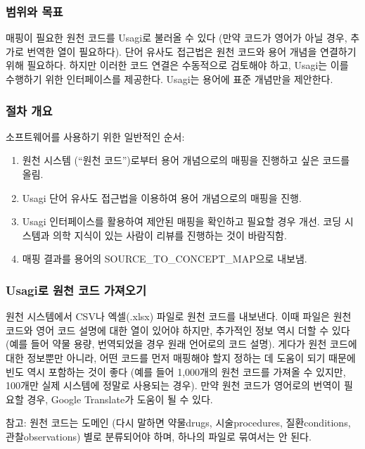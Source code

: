 \documentclass[10.5pt]{book}
\providecommand{\tightlist}{%
  \setlength{\itemsep}{0pt}\setlength{\parskip}{0pt}}
\theoremstyle{definition}
\theoremstyle{definition}
\theoremstyle{definition}
\theoremstyle{remark}
\begin{document}
\subsubsection*{범위와 목표}\label{--2}

매핑이 필요한 원천 코드를 Usagi로 불러올 수 있다 (만약 코드가 영어가
아닐 경우, 추가로 번역한 열이 필요하다). 단어 유사도 접근법은 원천
코드와 용어 개념을 연결하기 위해 필요하다. 하지만 이러한 코드 연결은
수동적으로 검토해야 하고, Usagi는 이를 수행하기 위한 인터페이스를
제공한다. Usagi는 용어에 표준 개념만을 제안한다.

\subsubsection*{절차 개요}\label{--2}

소프트웨어를 사용하기 위한 일반적인 순서:

\begin{enumerate}
\def\labelenumi{\arabic{enumi}.}
\tightlist
\item
  원천 시스템 (``원천 코드'')로부터 용어 개념으로의 매핑을 진행하고 싶은
  코드를 올림.
\item
  Usagi 단어 유사도 접근법을 이용하여 용어 개념으로의 매핑을 진행.
\item
  Usagi 인터페이스를 활용하여 제안된 매핑을 확인하고 필요할 경우 개선.
  코딩 시스템과 의학 지식이 있는 사람이 리뷰를 진행하는 것이 바람직함.
\item
  매핑 결과를 용어의 SOURCE\_TO\_CONCEPT\_MAP으로 내보냄.
\end{enumerate}

\subsubsection{Usagi로 원천 코드 가져오기}\label{usagi---}

원천 시스템에서 CSV나 엑셀(.xlsx) 파일로 원천 코드를 내보낸다. 이때
파일은 원천 코드와 영어 코드 설명에 대한 열이 있어야 하지만, 추가적인
정보 역시 더할 수 있다 (예를 들어 약물 용량, 번역되었을 경우 원래
언어로의 코드 설명). 게다가 원천 코드에 대한 정보뿐만 아니라, 어떤
코드를 먼저 매핑해야 할지 정하는 데 도움이 되기 때문에 빈도 역시
포함하는 것이 좋다 (예를 들어 1,000개의 원천 코드를 가져올 수 있지만,
100개만 실제 시스템에 정말로 사용되는 경우). 만약 원천 코드가 영어로의
번역이 필요할 경우, Google Translate가 도움이 될 수 있다.

참고: 원천 코드는 도메인 (다시 말하면 약물drugs, 시술procedures,
질환conditions, 관찰observations) 별로 분류되어야 하며, 하나의 파일로
묶여서는 안 된다.
\end{document}
